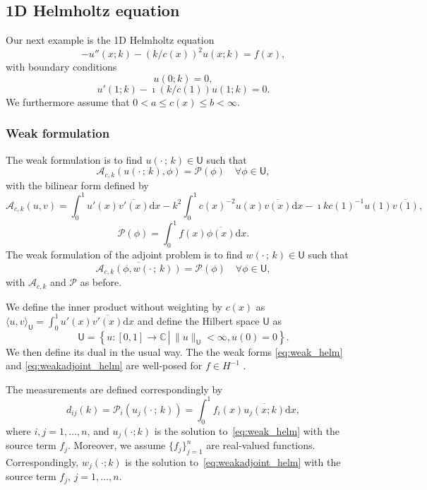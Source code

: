 \documentclass[12pt]{amsart}
\newcommand{\rd}{\mathrm{d}}
\begin{document}
\subsection{1D Helmholtz equation} Our next example is the 1D Helmholtz equation
\[
-u''(x;k) - (k / c(x))^2 u(x;k) = f(x),
\]
with boundary conditions
\[
u(0;k) = 0,
\]
\[
u'(1;k) - \imath \left(k/c(1)\right) u(1;k) = 0.
\]
We furthermore assume that $0 < a \leq c(x) \leq b < \infty$.

\subsubsection{Weak formulation}
The weak formulation is to find $u(\cdot\,; \,  k) \in \mathsf{U}$ such that
\begin{equation}\label{eq:weak_helm}
\mathcal{A}_{c,k}(u(\cdot\,;\, k), \phi) = \mathcal{P}(\phi)\quad \forall \phi \in \mathsf{U},
\end{equation}
with the bilinear form defined by
\[
\mathcal{A}_{c,k}(u,v) = \int_0^1 u'(x) \overline{v'(x)}\mathrm{d}x - k^2 \int_0^1 c(x)^{-2}u(x) \overline{v(x)}\mathrm{d}x -\imath k c(1)^{-1}u(1)\overline{v(1)},
\]
\[
\mathcal{P}(\phi) = \int_0^1 f(x)\overline{\phi(x)}\mathrm{d}x.
\]
The weak formulation of the adjoint problem is to find $w(\cdot \,;\, k) \in \mathsf{U}$ such that
\begin{equation}\label{eq:weakadjoint_helm}
\overline{\mathcal{A}_{c,k}(\phi, w(\cdot \,;\, k))} = \mathcal{P}(\phi)\quad \forall \phi \in \mathsf{U},
\end{equation}
with $\mathcal{A}_{c,k}$ and $\mathcal{P}$ as before. 

We define the inner product without weighting by $c(x)$ as $\langle u, v \rangle_\mathsf{U} = \int_0^1 u'(x)\overline{v'(x)}\mathrm{d}x$ and define the Hilbert space $\mathsf{U}$  as
\[
\mathsf{U} = \left\{ u : [0,1]\rightarrow\mathbb{C} \, \left|\, \|u\|_{\mathsf{U}} < \infty, u(0) = 0\right.\right\}.
\]
We then define its dual in the usual way. The the weak forms \eqref{eq:weak_helm} and \eqref{eq:weakadjoint_helm} are well-posed for $f \in H^{-1}$ \cite{Ihlenburg1997}.

The measurements are defined correspondingly by 
\[
d_{ij}(k) = \mathcal{P}_i(u_j(\cdot \,;\, k)) = \int_0^1 f_i(x) \overline{u_j(x;k)}  \rd x,
\]
where $i,j = 1,\ldots,n$, and $u_j(\cdot;k)$ is the solution to~\eqref{eq:weak_helm} with the source term $f_j$. Moreover, we assume $\{f_j\}_{j=1}^n$ are real-valued functions. Correspondingly, $w_j(\cdot;k)$ is the solution to~\eqref{eq:weakadjoint_helm} with the source term $f_j$, $j=1,\ldots,n$.
\end{document}
